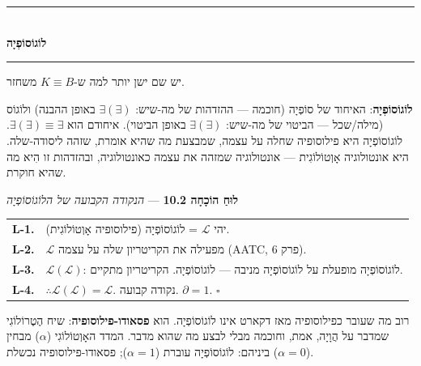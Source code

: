 \documentclass[10pt, openany, oneside]{book}
\renewcommand{\normalsize}{\fontsize{10}{13}\selectfont}
\renewcommand{\footnotesize}{\fontsize{8.5}{11}\selectfont}
\begin{document}
\vspace{1.5em}


\begin{center}
    \rule{0.3\textwidth}{0.4pt}\\[0.5em]
    {\normalsize\bfseries\textsc{לוֹגוֹסוֹפְיָה}}\\[0.3em]
    \rule{0.3\textwidth}{0.4pt}
\end{center}

\vspace{1em}

\noindent יש שם ישן יותר למה ש-$K \equiv B$ משחזר.

\textbf{לוֹגוֹסוֹפְיָה}: האיחוד של סוֹפְיָה (חוכמה — ההזדהות של מה-שיש: $\exists(\exists)$ באופן ההבנה) ולוֹגוֹס (מילה/שכל — הביטוי של מה-שיש: $\exists(\exists)$ באופן הביטוי). איחודם הוא $\exists(\exists) \equiv \exists$. לוֹגוֹסוֹפְיָה היא פילוסופיה שחלה על עצמה, שמבצעת מה שהיא אומרת, שזהה ליסודה-שלה. היא אונטולוגיה אָוְטוֹלוֹגִית — אונטולוגיה שמזהה את עצמה כאונטולוגיה, ובהזדהות זו הִיא מה שהיא חוקרת.

\vspace{0.5em}

\textbf{לוּחַ הוֹכָחָה 10.2} --- \textit{הנקודה הקבועה של הלוֹגוֹסוֹפְיָה}

\vspace{0.5em}

{\footnotesize
\noindent\begin{tabular}{r p{}}
\textbf{L-1.} & יהי $\mathcal{L}$ = לוֹגוֹסוֹפְיָה (פילוסופיה אָוְטוֹלוֹגִית). \\[0.3em]
\textbf{L-2.} & $\mathcal{L}$ מפעילה את הקריטריון שלה על עצמה (AATC, פרק 6). \\[0.3em]
\textbf{L-3.} & $\mathcal{L}(\mathcal{L})$: לוֹגוֹסוֹפְיָה מופעלת על לוֹגוֹסוֹפְיָה מניבה — לוֹגוֹסוֹפְיָה. הקריטריון מתקיים. \\[0.3em]
\textbf{L-4.} & $\therefore \mathcal{L}(\mathcal{L}) = \mathcal{L}$. נקודה קבועה. $\partial = 1$. $\square$ \\[0.3em]
\end{tabular}
}

\vspace{0.8em}

\noindent רוב מה שעובר כפילוסופיה מאז דקארט אינו לוֹגוֹסוֹפְיָה. הוא \textbf{פסאודו-פילוסופיה}: שיח הֶטֶרוֹלוֹגִי שמדבר על הֲוָיָה, אמת, וחוכמה מבלי לבצע מה שהוא מדבר. המדד האָוְטוֹלוֹגִי ($\alpha$) מבחין ביניהם: לוֹגוֹסוֹפְיָה עוברת ($\alpha = 1$); פסאודו-פילוסופיה נכשלת ($\alpha = 0$).
\end{document}

